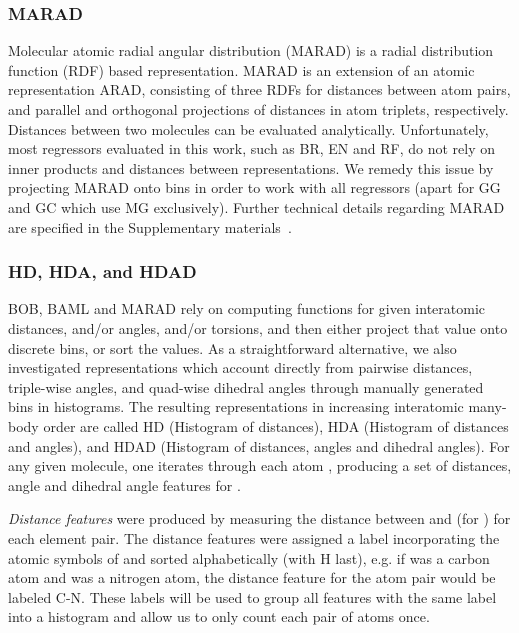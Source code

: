 \documentclass[reprint, superscriptaddress,
amsmath,amssymb, aps, prb,
]{revtex4-1}
\begin{document}
{\subsubsection{MARAD}
\label{sec:ARAD}

Molecular atomic radial angular distribution (MARAD) is a radial distribution function (RDF) based representation. 
MARAD is an extension of an atomic representation ARAD, consisting of  
three RDFs for distances between atom pairs, and parallel and orthogonal projections of distances in atom triplets, respectively.
Distances between two molecules can be evaluated analytically. 
Unfortunately, most regressors evaluated in this work, such as BR, EN and RF, do not rely on inner products and distances between representations. 
We remedy this issue by projecting MARAD onto bins in order to work with all regressors (apart for GG and GC which use MG exclusively).
Further technical details regarding MARAD are specified in the Supplementary materials~\cite{supplementary}.


\subsubsection{HD, HDA, and HDAD}

BOB, BAML and MARAD rely on computing functions for given interatomic distances, and/or angles, and/or torsions, 
and then either project that value onto discrete bins, or sort the values. 
As a straightforward alternative, we also investigated
representations which account directly from pairwise distances, triple-wise angles, and quad-wise dihedral angles through
manually generated bins in histograms. The resulting representations in
increasing interatomic many-body order are called HD (Histogram of distances), HDA (Histogram of distances and angles), and HDAD (Histogram of distances, angles and dihedral angles).
For any given molecule, one iterates through each atom , producing a set of distances, angle and dihedral angle features for .

\emph{Distance features} were produced by measuring the distance between  and  (for ) for each element pair.
	The distance features were assigned a label incorporating the atomic symbols of  and  sorted alphabetically (with H last), e.g. if  was a carbon atom and  was a nitrogen atom, the distance feature for the atom pair would be labeled C-N. 
	These labels will be used to group all features with the same label into a histogram and allow us to only count each pair of atoms once. 


}
\end{document}
